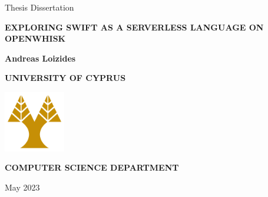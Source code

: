 \documentclass[12pt]{report}
\def\ptitle{Exploring Swift as a Serverless Language on OpenWhisk}
\begin{document}
\begin{titlepage}
\begin{center}
\vspace*{1cm}

Thesis Dissertation

\vspace*{2cm}
\begin{center}
\Large{\textbf{\MakeUppercase{\ptitle{}}}}
\end{center}

\vspace*{2cm}

\large{\textbf{Andreas Loizides}}

\vspace*{1cm}
\Large{\textbf{\MakeUppercase{University of Cyprus}}}

\vspace*{2cm}

\includegraphics[width=0.2\textwidth]{media/ucy-logo.png}

\vspace*{2cm}

\Large{\textbf{\MakeUppercase{Computer Science Department}}}

\vspace*{4cm}

\normalsize{May 2023}
\end{center}
\end{titlepage}
\end{document}
